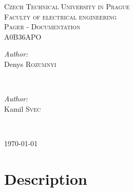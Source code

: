 \documentclass[12pt]{article}
\begin{document}
\begin{center}
\textsc{\LARGE Czech Technical University in Prague}\\[0.5cm]
\textsc{\Large Faculty of electrical engineering}\\[0.5cm]
\textsc{\Large Pager - Documentation}\\[0.5cm]
\textsc{\large A0B36APO}\\[0.5cm]

\begin{minipage}{0.4\textwidth}
\begin{flushleft} \large
\emph{Author:}\\
Denys \textsc{Rozumnyi} 
\end{flushleft}
\end{minipage}
~
\begin{minipage}{0.4\textwidth}
\begin{flushright} \large
\emph{Author:} \\
Kamil \textsc{Svec}
\end{flushright}
\end{minipage}\\[0.5cm]


\begin{center}
{\large \today}
\end{center}

\end{center}

\section{Description}
\end{document}
